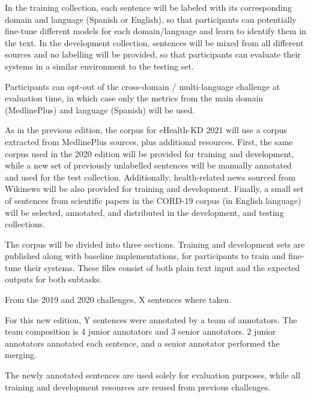 \documentclass[a4paper,11pt,twocolumn,twoside]{article}
\begin{document}
In the training collection, each sentence will be labeled with its corresponding domain and language (Spanish or English),
so that participants can potentially fine-tune different models for each domain/language and learn to identify them in the text.
In the development collection, sentences will be mixed from all different sources and no labelling will be provided,
so that participants can evaluate their systems in a similar environment to the testing set.

Participants can opt-out of the cross-domain / multi-language challenge at evaluation time,
in which case only the metrics from the main domain (MedlinePlus) and language (Spanish) will be used.

As in the previous edition, the corpus for eHealth-KD 2021 will use a corpus extracted from MedlinePlus sources, plus additional resources.
First, the same corpus used in the 2020 edition will be provided for training and development, while a new set of previously unlabelled sentences will be manually annotated and used for the test collection. Additionally, health-related news sourced from Wikinews will be also provided for training and development.
Finally, a small set of sentences from scientific papers in the CORD-19 corpus (in English language) will be selected, annotated, and distributed in the development, and testing collections.


The corpus will be divided into three sections. Training and development sets are published along with baseline implementations,
for participants to train and fine-tune their systems. These files consist of both plain text input and the expected outputs for both subtasks.


From the 2019 and 2020 challenges, X sentences where taken.

For this new edition, Y sentences were annotated by a team of annotators.
The team composition is 4 junior annotators and 3 senior annotators.
2 junior annotators annotated each sentence, and a senior annotator performed the merging.

The newly annotated sentences are used solely for evaluation purposes,
while all training and development resources are reused from previous challenges.
\end{document}
